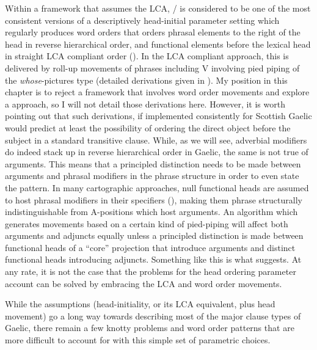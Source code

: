 \documentclass[output=paper,colorlinks,citecolor=brown]{langscibook}
\begin{document}
Within a framework that assumes the LCA, / is considered to be one of the most consistent versions of a descriptively head-initial parameter setting which regularly produces word orders that orders phrasal elements to the right of the head in reverse hierarchical order, and functional elements before the lexical head in straight LCA compliant order (\citealt{cinque17}). In the LCA compliant approach, this is delivered by roll-up movements of phrases including V involving pied piping of the \textit{whose}-pictures type (detailed derivations given in \citealt{cinque17}).  My position in this chapter is to reject a framework that involves word order movements and explore a  approach, so I will not detail those derivations here. However, it is worth pointing out that such derivations, if implemented consistently for Scottish Gaelic would predict at least the possibility of ordering the direct object before the subject in a standard transitive clause. While, as we will see, adverbial modifiers do indeed stack up in reverse hierarchical order in Gaelic, the same is not true of arguments. This means that a principled distinction needs to be made between arguments and phrasal modifiers in the phrase structure in order to even state the pattern. In many cartographic approaches, null functional heads are assumed to host phrasal modifiers in their specifiers (\citealt{cinque99}), making them phrase structurally indistinguishable from A-positions which host arguments. An algorithm which generates movements based on a certain kind of pied-piping will affect both arguments and adjuncts equally unless a principled distinction is made between functional heads of a “core” projection that introduce arguments and distinct functional heads introducing  adjuncts. Something like this is what \citet{cinque17} suggests. At any rate, it is not the case that the problems for the head ordering parameter account can be solved by embracing the LCA and word order movements. 

While the assumptions (head-initiality, or its LCA equivalent, plus head movement) go a long way towards describing most of the major clause types of  Gaelic, there remain a few knotty problems and word order patterns that are more difficult to account for with this simple set of parametric choices. 
\end{document}
